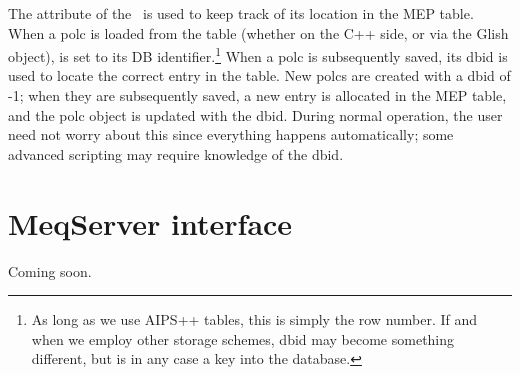 \documentclass[10pt]{article}
\begin{document}
  The  attribute of the \Polc\ is used to keep track of its
  location in the MEP table. When a polc is loaded from the table (whether on
  the C++ side, or via the Glish  object),  is
  set to its DB identifier.\footnote{As long as we use AIPS++ tables, this is
  simply the row number. If and when we employ other storage schemes, dbid  may
  become something different, but is in any case a key into the database.} 
  When a polc is subsequently saved, its dbid is used to locate the correct
  entry in the table. New polcs are created with a dbid of -1; when they are
  subsequently saved, a new entry is allocated in the MEP table, and the polc
  object is updated with the dbid. During normal operation, the user need not
  worry about this since everything happens automatically; some advanced
  scripting may require knowledge of the dbid.

\section{MeqServer interface}

Coming soon.
\end{document}
